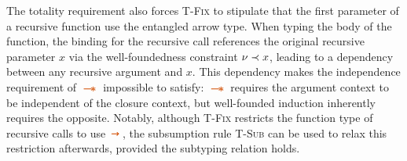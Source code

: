 The totality requirement also forces \textsc{T-Fix} to stipulate that
the first parameter of a recursive function use the entangled arrow
type. When typing the body of the function, the binding for the
recursive call references the original recursive parameter $x$ via the
well-foundedness constraint $\nu \prec x$, leading to a dependency
between any recursive argument and $x$.
This dependency makes the independence requirement of $\ctwand$
impossible to satisfy: $\ctwand$ requires the argument context to be
independent of the closure context, but well-founded induction
inherently requires the opposite. Notably, although \textsc{T-Fix}
restricts the function type of recursive calls to use $\ctsarr$, the
subsumption rule \textsc{T-Sub} can be used to relax this restriction
afterwards, provided the subtyping relation holds.



